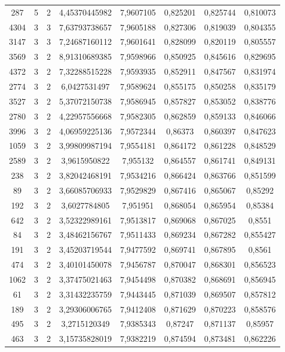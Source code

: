 \begin{longtable}{|c|c|c|c|c|c|c|c|}
287 & 5 & 2 & 4,45370445982 & 7,9607105 & 0,825201 & 0,825744 & 0,810073 \\
4304 & 3 & 3 & 7,63793738657 & 7,9605188 & 0,827306 & 0,819039 & 0,804355 \\
3147 & 3 & 3 & 7,24687160112 & 7,9601641 & 0,828099 & 0,820119 & 0,805557 \\
3569 & 3 & 2 & 8,91310689385 & 7,9598966 & 0,850925 & 0,845616 & 0,829695 \\
4372 & 3 & 2 & 7,32288515228 & 7,9593935 & 0,852911 & 0,847567 & 0,831974 \\
2774 & 3 & 2 & 6,0427531497 & 7,9589624 & 0,855175 & 0,850258 & 0,835179 \\
3527 & 3 & 2 & 5,37072150738 & 7,9586945 & 0,857827 & 0,853052 & 0,838776 \\
2780 & 3 & 2 & 4,22957556668 & 7,9582305 & 0,862859 & 0,859133 & 0,846066 \\
3996 & 3 & 2 & 4,06959225136 & 7,9572344 & 0,86373 & 0,860397 & 0,847623 \\
1059 & 3 & 2 & 3,99809987194 & 7,9554181 & 0,864172 & 0,861228 & 0,848529 \\
2589 & 3 & 2 & 3,9615950822 & 7,955132 & 0,864557 & 0,861741 & 0,849131 \\
238 & 3 & 2 & 3,82042468191 & 7,9534216 & 0,866424 & 0,863766 & 0,851599 \\
89 & 3 & 2 & 3,66085706933 & 7,9529829 & 0,867416 & 0,865067 & 0,85292 \\
192 & 3 & 2 & 3,6027784805 & 7,951951 & 0,868054 & 0,865954 & 0,85384 \\
642 & 3 & 2 & 3,52322989161 & 7,9513817 & 0,869068 & 0,867025 & 0,8551 \\
84 & 3 & 2 & 3,48462156767 & 7,9511433 & 0,869234 & 0,867282 & 0,855427 \\
191 & 3 & 2 & 3,45203719544 & 7,9477592 & 0,869741 & 0,867895 & 0,8561 \\
474 & 3 & 2 & 3,40101450078 & 7,9456787 & 0,870047 & 0,868301 & 0,856523 \\
1062 & 3 & 2 & 3,37475021463 & 7,9454498 & 0,870382 & 0,868691 & 0,856945 \\
61 & 3 & 2 & 3,31432235759 & 7,9443445 & 0,871039 & 0,869507 & 0,857812 \\
189 & 3 & 2 & 3,29306006765 & 7,9412408 & 0,871629 & 0,870223 & 0,858576 \\
495 & 3 & 2 & 3,2715120349 & 7,9385343 & 0,87247 & 0,871137 & 0,85957 \\
463 & 3 & 2 & 3,15735828019 & 7,9382219 & 0,874594 & 0,873481 & 0,862226 \\

\end{longtable}
